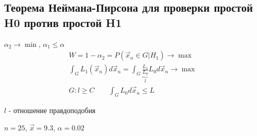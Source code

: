 \documentclass{article}
\begin{document}
\subsection{Теорема Неймана-Пирсона для проверки простой H0 против простой H1}
$\alpha_2 \to \min$, $\alpha_1 \le \alpha$
\begin{gather*}
  W=1 - \alpha_2=P(\vec{x}_n \in G | H_1) \to \max \\ 
  \int_{G}^{}L_1(\vec{x}_n)d\vec{x}_n= \int_{G}^{}\underbrace{\frac{L_1}{L_0}}_{l}L_0d\vec{x}_n \to \max \\ 
  G: l \ge C \qquad \int_{G}^{}L_0 d \vec{x}_n \le L
\end{gather*}

$l$ - отношение правдоподобия

\begin{eg}
  $n=25$, $\vec{x}=9.3$, $\alpha=0.02$


\end{eg}
\end{document}
